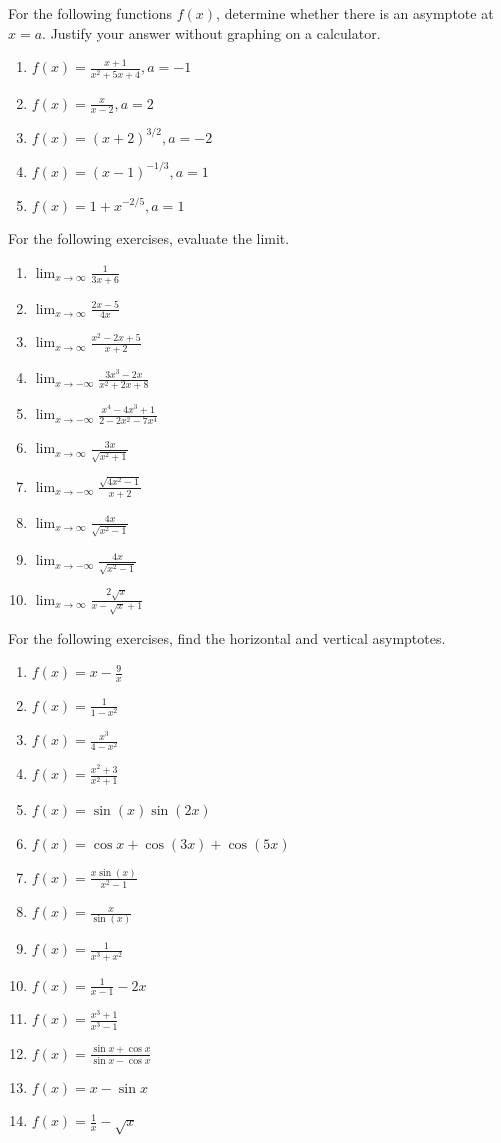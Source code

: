 \documentclass{exercises}
\begin{document}
For the following functions $f(x)$, determine whether there is an asymptote at $x=a$. Justify your answer without graphing on a calculator.

\begin{enumerate}[resume]
\item $f(x)=\frac{x+1}{x^{2}+5x+4},a=-1$
\item $f(x)=\frac{x}{x-2},a=2$
\item $f(x)={(x+2)}^{3/2},a=-2$
\item $f(x)={(x-1)}^{-1/3},a=1$
\item $f(x)=1+x^{-2/5},a=1$
\end{enumerate}

For the following exercises, evaluate the limit.

\begin{enumerate}[resume]
\item $\lim_{x\to \infty}\frac{1}{3x+6}$
\item $\lim_{x\to \infty}\frac{2x-5}{4x}$
\item $\lim_{x\to \infty}\frac{x^{2}-2x+5}{x+2}$
\item $\lim_{x\to-\infty}\frac{3x^{3}-2x}{x^{2}+2x+8}$
\item $\lim_{x\to-\infty}\frac{x^{4}-4x^{3}+1}{2-2x^{2}-7x^{4}}$
\item $\lim_{x\to \infty}\frac{3x}{\sqrt{x^{2}+1}}$
\item $\lim_{x\to-\infty}\frac{\sqrt{4x^{2}-1}}{x+2}$
\item $\lim_{x\to \infty}\frac{4x}{\sqrt{x^{2}-1}}$
\item $\lim_{x\to-\infty}\frac{4x}{\sqrt{x^{2}-1}}$
\item $\lim_{x\to \infty}\frac{2\sqrt{x}}{x-\sqrt{x}+1}$
\end{enumerate}

For the following exercises, find the horizontal and vertical asymptotes.

\begin{enumerate}[resume]
\item $f(x)=x-\frac{9}{x}$
\item $f(x)=\frac{1}{1-x^{2}}$
\item $f(x)=\frac{x^{3}}{4-x^{2}}$
\item $f(x)=\frac{x^{2}+3}{x^{2}+1}$
\item $f(x)=\sin(x)\sin(2x)$
\item $f(x)=\cos x+\cos(3x)+\cos(5x)$
\item $f(x)=\frac{x\sin(x)}{x^{2}-1}$
\item $f(x)=\frac{x}{\sin(x)}$
\item $f(x)=\frac{1}{x^{3}+x^{2}}$
\item $f(x)=\frac{1}{x-1}-2x$
\item $f(x)=\frac{x^{3}+1}{x^{3}-1}$
\item $f(x)=\frac{\sin x+\cos x}{\sin x-\cos x}$
\item $f(x)=x-\sin x$
\item $f(x)=\frac{1}{x}-\sqrt{x}$
\end{enumerate}
\end{document}
